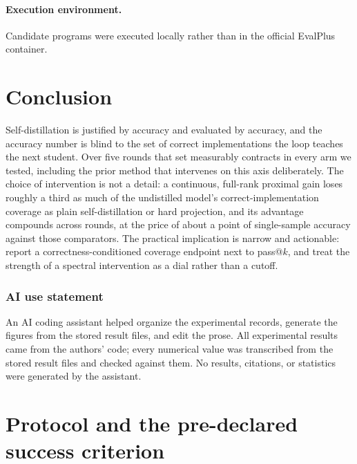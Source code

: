 \documentclass{article}
\begin{document}
\paragraph{Execution environment.} Candidate programs were executed locally rather than in the official EvalPlus container.

\section{Conclusion}
\label{sec:conclusion}

Self-distillation is justified by accuracy and evaluated by accuracy, and the accuracy number is blind to the set of correct implementations the loop teaches the next student. Over five rounds that set measurably contracts in every arm we tested, including the prior method that intervenes on this axis deliberately. The choice of intervention is not a detail: a continuous, full-rank proximal gain loses roughly a third as much of the undistilled model's correct-implementation coverage as plain self-distillation or hard projection, and its advantage compounds across rounds, at the price of about a point of single-sample accuracy against those comparators. The practical implication is narrow and actionable: report a correctness-conditioned coverage endpoint next to pass@$k$, and treat the strength of a spectral intervention as a dial rather than a cutoff.

\subsubsection*{AI use statement}
An AI coding assistant helped organize the experimental records, generate the figures from the stored result files, and edit the prose. All experimental results came from the authors' code; every numerical value was transcribed from the stored result files and checked against them. No results, citations, or statistics were generated by the assistant.




\appendix
\renewcommand{\thesection}{\Alph{section}}

\section{Protocol and the pre-declared success criterion}
\label{app:protocol}
\end{document}
